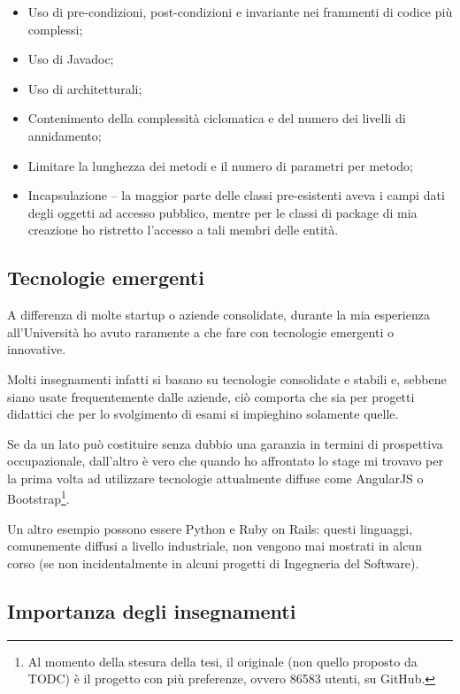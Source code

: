 \begin{itemize}
\item Uso di pre-condizioni, post-condizioni e invariante nei frammenti di
  codice più complessi;
\item Uso di Javadoc;
\item Uso di  architetturali;
\item Contenimento della complessità ciclomatica e del numero dei livelli di
  annidamento;
\item Limitare la lunghezza dei metodi e il numero di parametri per metodo;
\item Incapsulazione -- la maggior parte delle classi pre-esistenti aveva i
  campi dati degli oggetti ad accesso pubblico, mentre per le classi di
  package di mia creazione ho ristretto l'accesso a tali membri delle entità.
\end{itemize}

\subsection{Tecnologie emergenti}

A differenza di molte startup o aziende consolidate, durante la mia esperienza
all'Università ho avuto raramente a che fare con tecnologie emergenti o
innovative.

Molti insegnamenti infatti si basano su tecnologie consolidate e stabili e,
sebbene siano usate frequentemente dalle aziende, ciò comporta che sia per
progetti didattici che per lo svolgimento di esami si impieghino solamente
quelle.

Se da un lato può costituire senza dubbio una garanzia in termini di
prospettiva occupazionale, dall'altro è vero che quando ho affrontato lo stage
mi trovavo per la prima volta ad utilizzare tecnologie attualmente diffuse
come AngularJS o Bootstrap\footnote{Al momento della stesura della tesi, il
 originale (non quello proposto da TODC) è il progetto con
più preferenze, ovvero 86583 utenti, su GitHub.}.

Un altro esempio possono essere Python e Ruby on Rails: questi linguaggi,
comunemente diffusi a livello industriale, non vengono mai mostrati in alcun
corso (se non incidentalmente in alcuni progetti di Ingegneria del Software).

\subsection{Importanza degli insegnamenti}

